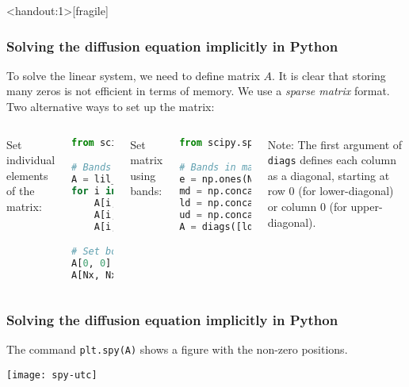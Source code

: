 \begin{frame}<handout:1>[fragile]
  \frametitle{Solving the diffusion equation implicitly in Python}
  To solve the linear system, we need to define matrix $A$. It is clear that storing many zeros is not efficient in terms of memory. We use a \emph{sparse matrix} format. Two alternative ways to set up the matrix:\\
  
  \begin{columns}[t]
  Set individual elements of the matrix:
  \begin{lstlisting}[language=Python,basicstyle=\scriptsize\ttfamily]
from scipy.sparse import lil_matrix

# Bands in matrix (internal cells)
A = lil_matrix((Nx+1, Nx+1))
for i in range(1, Nx):
    A[i, i-1] = -Fo
    A[i, i]   = 1 + 2*Fo
    A[i, i+1] = -Fo

# Set boundary cells, only main diag:
A[0, 0] = 1       # Left
A[Nx, Nx] = 1     # Right
  \end{lstlisting}
  Set matrix using bands:
    \begin{lstlisting}[language=Python,basicstyle=\scriptsize\ttfamily]
from scipy.sparse import diags

# Bands in matrix (internal cells)
e = np.ones(Nx-1) # Ones for internal cells
md = np.concatenate(([1], e * (1 + 2*Fo), [1])) # Main diagonal
ld = np.concatenate((-e * Fo, [0, 0])) # Lower diagonal
ud = np.concatenate(([0, 0], -e * Fo)) # Upper diagonal
A = diags([ld, md, ud], offsets=[-1, 0, 1])
  \end{lstlisting}
  Note: The first argument of \lstinline|diags| defines each column as a diagonal, starting at row 0 (for lower-diagonal) or column 0 (for upper-diagonal).
  \end{columns}
\end{frame}


\begin{frame}[fragile]
  \frametitle{Solving the diffusion equation implicitly in Python}
  The command \lstinline|plt.spy(A)| shows a figure with the non-zero positions.
  \begin{center}
    \texttt{[image: spy-utc]}
  \end{center}
\end{frame}


